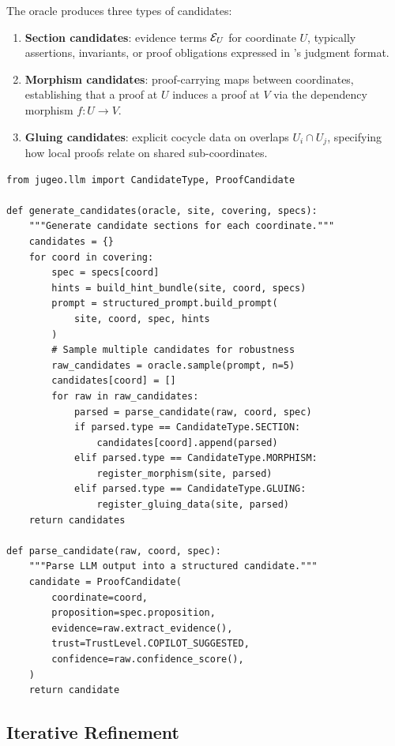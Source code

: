 \documentclass[11pt]{article}
\begin{document}
The oracle produces three types of candidates:

\begin{enumerate}
  \item \textbf{Section candidates}: evidence terms $\mathcal{E}_U$ for
    coordinate $U$, typically assertions, invariants, or proof
    obligations expressed in \JuGeo's judgment format.
  \item \textbf{Morphism candidates}: proof-carrying maps between
    coordinates, establishing that a proof at $U$ induces a proof at
    $V$ via the dependency morphism $f : U \to V$.
  \item \textbf{Gluing candidates}: explicit cocycle data on overlaps
    $U_i \cap U_j$, specifying how local proofs relate on shared
    sub-coordinates.
\end{enumerate}

\begin{lstlisting}[style=jugeo-python,caption={Candidate generation via LLM oracle.}]
from jugeo.llm import CandidateType, ProofCandidate

def generate_candidates(oracle, site, covering, specs):
    """Generate candidate sections for each coordinate."""
    candidates = {}
    for coord in covering:
        spec = specs[coord]
        hints = build_hint_bundle(site, coord, specs)
        prompt = structured_prompt.build_prompt(
            site, coord, spec, hints
        )
        # Sample multiple candidates for robustness
        raw_candidates = oracle.sample(prompt, n=5)
        candidates[coord] = []
        for raw in raw_candidates:
            parsed = parse_candidate(raw, coord, spec)
            if parsed.type == CandidateType.SECTION:
                candidates[coord].append(parsed)
            elif parsed.type == CandidateType.MORPHISM:
                register_morphism(site, parsed)
            elif parsed.type == CandidateType.GLUING:
                register_gluing_data(site, parsed)
    return candidates

def parse_candidate(raw, coord, spec):
    """Parse LLM output into a structured candidate."""
    candidate = ProofCandidate(
        coordinate=coord,
        proposition=spec.proposition,
        evidence=raw.extract_evidence(),
        trust=TrustLevel.COPILOT_SUGGESTED,
        confidence=raw.confidence_score(),
    )
    return candidate
\end{lstlisting}

\subsection{Iterative Refinement}\label{subsec:refinement}
\end{document}
